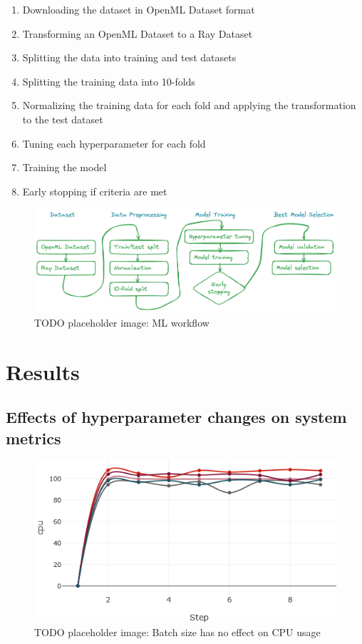 \begin{enumerate}
    \item Downloading the dataset in OpenML Dataset format
    \item Transforming an OpenML Dataset to a Ray Dataset
    \item Splitting the data into training and test datasets
    \item Splitting the training data into 10-folds
    \item Normalizing the training data for each fold and applying the transformation to the test dataset
    \item Tuning each hyperparameter for each fold
    \item Training the model
    \item Early stopping if criteria are met
\end{enumerate}

\begin{figure}[h]
    \includegraphics[width=12cm]{assets/ml_workflow1.png}
    \caption{TODO placeholder image: ML workflow}
    \label{figure:mlworkflow}
\end{figure}

\section{Results}

\subsection{Effects of hyperparameter changes on system metrics}





\begin{figure}[h]
    \includegraphics[width=12cm]{assets/batch_size_vs_cpu.png}
    \caption{TODO placeholder image: Batch size has no effect on CPU usage}
    \label{figure:batchvscpu}
\end{figure}

